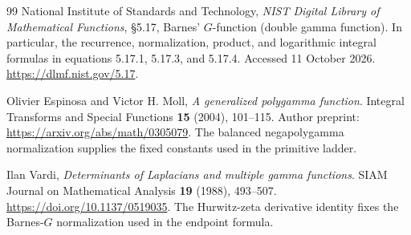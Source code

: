 \documentclass[11pt,letterpaper]{article}
\numberwithin{equation}{section}
\theoremstyle{plain}
\theoremstyle{definition}
\theoremstyle{remark}
\begin{document}
\begin{thebibliography}{99}
National Institute of Standards and Technology,
\emph{NIST Digital Library of Mathematical Functions},
\S5.17, Barnes' $G$-function (double gamma function).
In particular, the recurrence, normalization, product, and logarithmic
integral formulas in equations 5.17.1, 5.17.3, and 5.17.4.
Accessed 11 October 2026.
\url{https://dlmf.nist.gov/5.17}.

Olivier Espinosa and Victor H. Moll,
\emph{A generalized polygamma function}.
Integral Transforms and Special Functions \textbf{15} (2004), 101--115.
Author preprint: \url{https://arxiv.org/abs/math/0305079}.
The balanced negapolygamma normalization supplies the fixed constants
used in the primitive ladder.

Ilan Vardi,
\emph{Determinants of Laplacians and multiple gamma functions}.
SIAM Journal on Mathematical Analysis \textbf{19} (1988), 493--507.
\url{https://doi.org/10.1137/0519035}.
The Hurwitz-zeta derivative identity fixes the Barnes-$G$ normalization
used in the endpoint formula.


\end{thebibliography}
\end{document}
